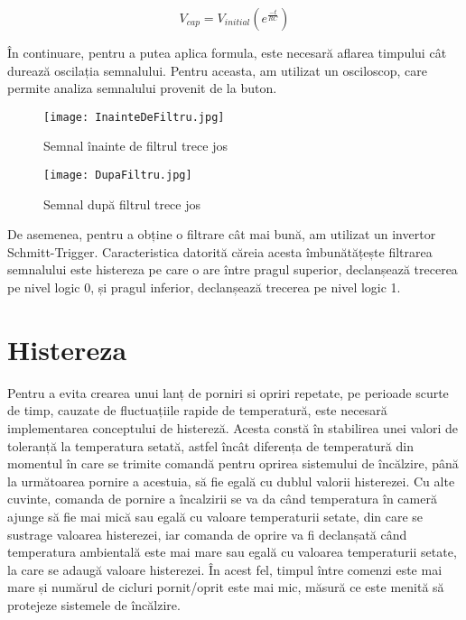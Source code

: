 \begin{equation}
V_{cap} = V_{initial}(e^{\frac{-t}{RC}})                 
\end{equation}

	În continuare, pentru a putea aplica formula, este necesară aflarea timpului cât durează oscilația semnalului. Pentru aceasta, am utilizat un osciloscop, care permite analiza semnalului provenit de la buton.

\begin{figure}[H]
	\centering
    	\texttt{[image: InainteDeFiltru.jpg]}
	\caption{Semnal înainte de filtrul trece jos}
\end{figure}

\begin{figure}[H]
   	\centering
    	\texttt{[image: DupaFiltru.jpg]}
	\caption{Semnal după filtrul trece jos}
\end{figure}
	
	De asemenea, pentru a obține o filtrare cât mai bună, am utilizat un invertor Schmitt-Trigger. Caracteristica datorită căreia acesta îmbunătățește filtrarea semnalului este histereza pe care o are între pragul superior, declanșează trecerea pe nivel logic 0, și pragul inferior, declanșează trecerea pe nivel logic 1.  
	
\section{Histereza}

	Pentru a evita crearea unui lanț de porniri si opriri repetate, pe perioade scurte de timp, cauzate de fluctuațiile rapide de temperatură, este necesară implementarea conceptului de histereză. Acesta constă în stabilirea unei valori de toleranță la temperatura setată, astfel încât diferența de temperatură din momentul în care se trimite comandă pentru oprirea sistemului de încălzire, până la următoarea pornire a acestuia, să fie egală cu dublul valorii histerezei. Cu alte cuvinte, comanda de pornire a încalzirii se va da când temperatura în cameră ajunge să fie mai mică sau egală cu valoare temperaturii setate, din care se sustrage valoarea histerezei, iar comanda de oprire va fi declanșată când temperatura ambientală este mai mare sau egală cu valoarea temperaturii setate, la care se adaugă valoare histerezei. În acest fel, timpul între comenzi este mai mare și numărul de cicluri pornit/oprit este mai mic, măsură ce este menită să protejeze sistemele de încălzire.


	 
 